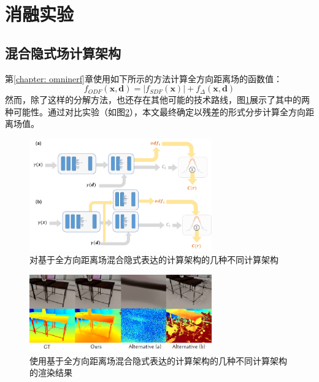 \newpage
\section{消融实验}

\subsection{混合隐式场计算架构}
第\ref{chapter: omninerf}章使用如下所示的方法计算全方向距离场的函数值：
\begin{equation}
    f_{ODF}(\mathbf{x}, \mathbf{d}) = |f_{SDF}(\mathbf{x})| + f_\Delta(\mathbf{x}, \mathbf{d})
\end{equation}
然而，除了这样的分解方法，也还存在其他可能的技术路线，图\ref{fig:omninerf-ablation-structure}展示了其中的两种可能性。通过对比实验（如图\ref{fig:omninerf-ablation-qualitative}），本文最终确定以残差的形式分步计算全方向距离场值。

\begin{figure}[ht]
    \centering
    \includegraphics[width=0.7\textwidth]{undergraduate-thesis/images/experiments/omninerf-ablation-structure.png}
    \caption{对基于全方向距离场混合隐式表达的计算架构的几种不同计算架构}
    \label{fig:omninerf-ablation-structure}
\end{figure}

\begin{figure}[ht]
    \centering
    \includegraphics[width=0.7\textwidth]{undergraduate-thesis/images/experiments/omninerf-ablation-qualitative.png}
    \caption{使用基于全方向距离场混合隐式表达的计算架构的几种不同计算架构的渲染结果}
    \label{fig:omninerf-ablation-qualitative}
\end{figure}

